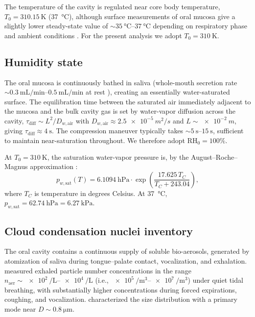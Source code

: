 \documentclass[11pt,a4paper]{article}
\newcommand{\pwsat}{p_{w,\text{sat}}}
\theoremstyle{definition}
\theoremstyle{plain}
\begin{document}
The temperature of the cavity is regulated near core body temperature, $T_0 = \SI{310.15}{\kelvin}$ (\SI{37}{\celsius}), although surface measurements of oral mucosa give a slightly lower steady-state value of $\sim\!\SI{35}{\celsius}\text{--}\SI{37}{\celsius}$ depending on respiratory phase and ambient conditions \citep{Mariak1999}. For the present analysis we adopt $T_0 = \SI{310}{\kelvin}$.

\subsection{Humidity state}
\label{sec:humidity}

The oral mucosa is continuously bathed in saliva (whole-mouth secretion rate $\sim\SIrange{0.3}{0.5}{\milli\liter\per\minute}$ at rest \citep{Dawes1972}), creating an essentially water-saturated surface. The equilibration time between the saturated air immediately adjacent to the mucosa and the bulk cavity gas is set by water-vapor diffusion across the cavity, $\tau_{\text{diff}} \sim L^2/D_{w,\text{air}}$ with $D_{w,\text{air}} \approx \SI{2.5e-5}{m^2/s}$ and $L \sim \SI{e-2}{m}$, giving $\tau_{\text{diff}} \approx \SI{4}{\second}$. The compression maneuver typically takes $\sim\SIrange{5}{15}{\second}$, sufficient to maintain near-saturation throughout. We therefore adopt $\mathrm{RH}_0 = 100\%$.

At $T_0 = \SI{310}{\kelvin}$, the saturation water-vapor pressure is, by the August–Roche–Magnus approximation \citep{Lawrence2005}:
\begin{equation}
\label{eq:ARM}
\pwsat(T) = \SI{6.1094}{\hecto\pascal} \cdot \exp\!\left(\frac{17.625\,T_C}{T_C + 243.04}\right),
\end{equation}
where $T_C$ is temperature in degrees Celsius. At \SI{37}{\celsius}, $\pwsat = \SI{62.74}{\hecto\pascal} = \SI{6.27}{\kilo\pascal}$.

\subsection{Cloud condensation nuclei inventory}
\label{sec:CCN}

The oral cavity contains a continuous supply of soluble bio-aerosols, generated by atomization of saliva during tongue–palate contact, vocalization, and exhalation. \citet{Edwards2004} measured exhaled particle number concentrations in the range $n_{\text{aer}} \sim \SIrange{e2}{e4}{\per\liter}$ (i.e., $\SIrange{e5}{e7}{\per\cubic\meter}$) under quiet tidal breathing, with substantially higher concentrations during forced expirations, coughing, and vocalization. \citet{Papineni1997} characterized the size distribution with a primary mode near $D \sim \SI{0.8}{\micro\meter}$.
\end{document}
